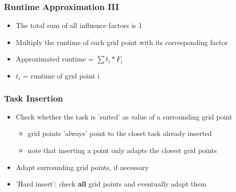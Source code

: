 \begin{frame}
\begin{minipage}[t]{0.60\linewidth}
	\end{minipage}\hfill
\end{frame}

\begin{frame}
	\frametitle {Runtime Approximation III}	
		\begin{itemize}
			\item<2->{The total sum of all influence factors is 1}
			\item<3->{Multiply the runtime of each grid point with its corresponding factor}
			\item<4->{Approximated runtime = $\sum t_i * F_i$}
			\item<5->{$t_i$ = runtime of grid point i}					
		\end{itemize}				
\end{frame}

\begin{frame}
	\frametitle{Task Insertion}
		\begin{itemize}
			\item<2->{Check whether the task is 'suited' as value of a 													surrounding grid point}
			\begin{itemize}
				\item<3->{grid points 'always' point to the closet task already inserted}
				\item<4->{note that inserting a point only adapts the 														closest grid points}
			\end{itemize}
			\item<5->{Adapt surrounding grid points, if necessary}
		\end{itemize}
		
		\begin{itemize}
			\item<6->{'Hard insert': check \textbf{all} grid points and eventually adapt them}
		\end{itemize}	
\end{frame}

